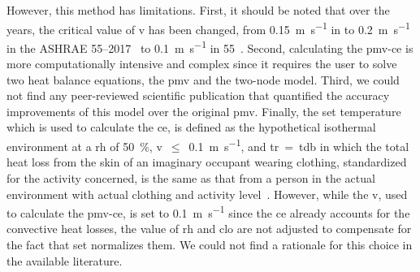 However, this method has limitations.
First, it should be noted that over the years, the critical value of \ac{v} has been changed, from \qty{0.15}{\m\per\s} in  to \qty{0.2}{\m\per\s} in the ASHRAE 55--2017~\cite{ASHRAE552017, arens_moving_2009} to \qty{0.1}{\m\per\s} in \gls{55}~\cite{ashrae552023}.
Second, calculating the \ac{pmv-ce} is more computationally intensive and complex since it requires the user to solve two heat balance equations, the \ac{pmv} and the two-node model.
Third, we could not find any peer-reviewed scientific publication that quantified the accuracy improvements of this model over the original \ac{pmv}.
Finally, the \ac{set} temperature which is used to calculate the \ac{ce}, is defined as the hypothetical isothermal environment at a \ac{rh} of \qty{50}{\percent}, \ac{v}~$\leq$~\qty{0.1}{\m\per\s}, and \ac{tr}~=~\ac{tdb} in which the total heat loss from the skin of an imaginary occupant wearing clothing, standardized for the activity concerned, is the same as that from a person in the actual environment with actual clothing and activity level~\cite{ashrae552023}.
However, while the \ac{v}, used to calculate the \ac{pmv-ce}, is set to \qty{0.1}{\m\per\s} since the \ac{ce} already accounts for the convective heat losses, the value of \ac{rh} and \ac{clo} are not adjusted to compensate for the fact that \ac{set} normalizes them.
We could not find a rationale for this choice in the available literature.

